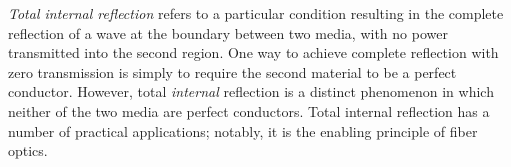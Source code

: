 

\label{m0169_Total_Internal_Reflection} %

\emph{Total internal reflection} refers to a particular condition resulting in the complete reflection of a wave at the boundary between two media, with no power transmitted into the second region.
One way to achieve complete reflection with zero transmission is simply to require the second material to be a perfect conductor.
However, total \emph{internal} reflection is a distinct phenomenon in which neither of the two media are perfect conductors.
Total internal reflection has a number of practical applications; notably, it is the enabling principle of fiber optics.


